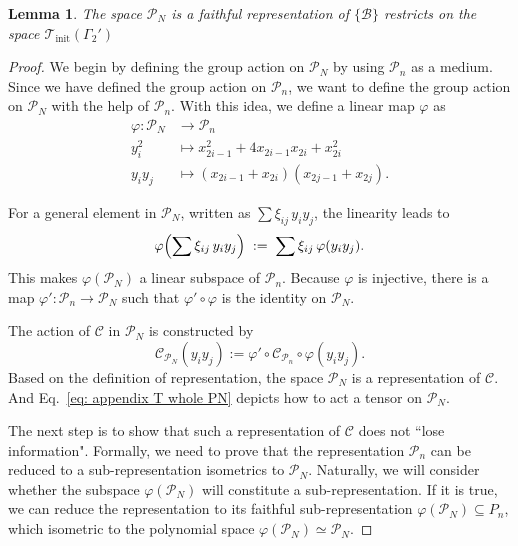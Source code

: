 \documentclass[showpacs,twocolumn,aps,prx,long bibliography,superscriptaddress,notitlepage]{revtex4-1}
\newtheorem{lemma}{Lemma}
\newcommand{\Tcal}{\mathcal{T}}
\begin{document}
\begin{lemma}
    \label{lemma: reduce Pn to PN}
    The space $\mathcal{P}_N$ is a faithful representation of $\{\mathcal{B}\}$ restricts on the space $\Tcal_\text{init}(\Gamma_2')$
\end{lemma}
\begin{proof}
We begin by defining the group action on \(\mathcal{P}_N\) by using \(\mathcal{P}_n\) as a medium. Since we have defined the group action on \(\mathcal{P}_n\), we want to define the group action on \(\mathcal{P}_N\) with the help of \(\mathcal{P}_n\). With this idea, we define a linear map $\varphi$ as
\begin{equation}
    \begin{aligned}
        \varphi : \mathcal{P}_N &\to \mathcal{P}_n \\
          y_i^2 &\mapsto x_{2i-1}^2+4 x_{2i-1} x_{2i}+x_{2i}^2\\
       y_i y_j &\mapsto  \left(x_{2i-1}+x_{2i}\right)\left(x_{2j-1}+x_{2j}\right).
    \end{aligned}
\end{equation}
    
For a general element in \(\mathcal{P}_N\), written as \(\sum \xi_{ij}\,y_i y_j\), the linearity leads to
\[
\varphi\Bigl(\sum \xi_{ij}\,y_i y_j\Bigr)
\;:=\;
\sum \xi_{ij}\,\varphi(y_i y_j).
\]
    This makes \(\varphi(\mathcal{P}_N)\) a linear subspace of \(\mathcal{P}_n\). Because \(\varphi\) is injective, there is a map \(\varphi': \mathcal{P}_n \to \mathcal{P}_N\) such that \(\varphi' \circ \varphi\) is the identity on \(\mathcal{P}_N\).  
    
    The action of $\mathcal{C}$ in $\mathcal{P}_N$ is constructed by 
    \begin{equation}
        \mathcal{C}_{\mathcal{P}_N}(y_i y_j) := \varphi' \circ \mathcal{C}_{\mathcal{P}_n}\circ \varphi(y_i y_j).
        \label{eq: appendix T whole PN}
    \end{equation}
    Based on the definition of representation, the space $\mathcal{P}_N$ is a representation of $\mathcal{C}$. And Eq.~\eqref{eq: appendix T whole PN} depicts how to act a tensor on $\mathcal{P}_N$.
    
    The next step is to show that such a representation of $\mathcal{C}$ does not ``lose information". Formally, we need to prove that the representation $\mathcal{P}_n$ can be reduced to a sub-representation isometrics to $\mathcal{P}_N$. Naturally, we will consider whether the subspace $\varphi(\mathcal{P}_N) $ will constitute a sub-representation. If it is true, we can reduce the representation to its faithful sub-representation $\varphi(\mathcal{P}_N)\subseteq{P}_n $, which isometric to the polynomial space $\varphi(\mathcal{P}_N) \simeq \mathcal{P}_N$.
    


\end{proof}
\end{document}
